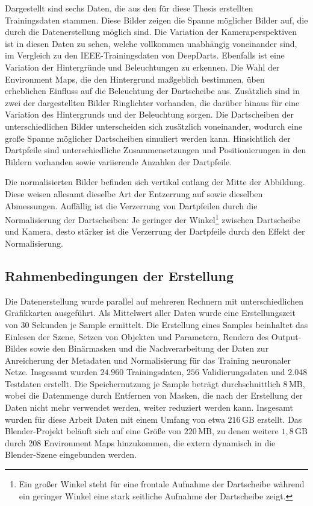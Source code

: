 Dargestellt sind sechs Daten, die aus den für diese Thesis erstellten Trainingsdaten stammen. Diese Bilder zeigen die Spanne möglicher Bilder auf, die durch die Datenerstellung möglich sind. Die Variation der Kameraperspektiven ist in diesen Daten zu sehen, welche vollkommen unabhängig voneinander sind, im Vergleich zu den IEEE-Trainingsdaten von DeepDarts. Ebenfalls ist eine Variation der Hintergründe und Beleuchtungen zu erkennen. Die Wahl der Environment Maps, die den Hintergrund maßgeblich bestimmen, üben erheblichen Einfluss auf die Beleuchtung der Dartscheibe aus. Zusätzlich sind in zwei der dargestellten Bilder Ringlichter vorhanden, die darüber hinaus für eine Variation des Hintergrunds und der Beleuchtung sorgen. Die Dartscheiben der unterschiedlichen Bilder unterscheiden sich zusätzlich voneinander, wodurch eine große Spanne möglicher Dartscheiben simuliert werden kann. Hinsichtlich der Dartpfeile sind unterschiedliche Zusammensetzungen und Positionierungen in den Bildern vorhanden sowie variierende Anzahlen der Dartpfeile.

Die normalisierten Bilder befinden sich vertikal entlang der Mitte der Abbildung. Diese weisen allesamt dieselbe Art der Entzerrung auf sowie dieselben Abmessungen. Auffällig ist die Verzerrung von Dartpfeilen durch die Normalisierung der Dartscheiben: Je geringer der Winkel\footnote{Ein großer Winkel steht für eine frontale Aufnahme der Dartscheibe während ein geringer Winkel eine stark seitliche Aufnahme der Dartscheibe zeigt.} zwischen Dartscheibe und Kamera, desto stärker ist die Verzerrung der Dartpfeile durch den Effekt der Normalisierung.


\subsection{Rahmenbedingungen der Erstellung}  %
\label{sec:render_info}

Die Datenerstellung wurde parallel auf mehreren Rechnern mit unterschiedlichen Grafikkarten ausgeführt. Als Mittelwert aller Daten wurde eine Erstellungszeit von 30 Sekunden je Sample ermittelt. Die Erstellung eines Samples beinhaltet das Einlesen der Szene, Setzen von Objekten und Parametern, Rendern des Output-Bildes sowie den Binärmasken und die Nachverarbeitung der Daten zur Anreicherung der Metadaten und Normalisierung für das Training neuronaler Netze. Insgesamt wurden $24.960$ Trainingsdaten, $256$ Validierungsdaten und $2.048$ Testdaten erstellt. Die Speichernutzung je Sample beträgt durchschnittlich 8\,MB, wobei die Datenmenge durch Entfernen von Masken, die nach der Erstellung der Daten nicht mehr verwendet werden, weiter reduziert werden kann. Insgesamt wurden für diese Arbeit Daten mit einem Umfang von etwa $216\,\text{GB}$ erstellt. Das Blender-Projekt beläuft sich auf eine Größe von $220\,\text{MB}$, zu denen weitere $1,\!8\,\text{GB}$ durch 208 Environment Maps hinzukommen, die extern dynamisch in die Blender-Szene eingebunden werden.

